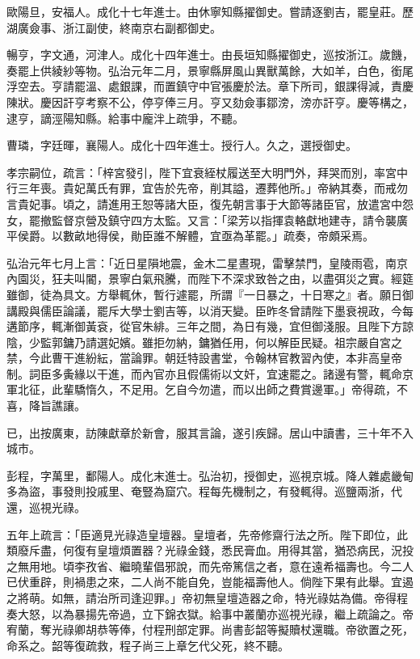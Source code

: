 \begin{pinyinscope}
歐陽旦，安福人。成化十七年進士。由休寧知縣擢御史。嘗請逐劉吉，罷皇莊。歷湖廣僉事、浙江副使，終南京右副都御史。

暢亨，字文通，河津人。成化十四年進士。由長垣知縣擢御史，巡按浙江。歲饑，奏罷上供綾紗等物。弘治元年二月，景寧縣屏風山異獸萬餘，大如羊，白色，銜尾浮空去。亨請罷溫、處銀課，而置鎮守中官張慶於法。章下所司，銀課得減，責慶陳狀。慶因訐亨考察不公，停亨俸三月。亨又劾僉事鄒滂，滂亦訐亨。慶等構之，逮亨，謫涇陽知縣。給事中龐泮上疏爭，不聽。

曹璘，字廷暉，襄陽人。成化十四年進士。授行人。久之，選授御史。

孝宗嗣位，疏言：「梓宮發引，陛下宜衰絰杖履送至大明門外，拜哭而別，率宮中行三年喪。貴妃萬氏有罪，宜告於先帝，削其謚，遷葬他所。」帝納其奏，而戒勿言貴妃事。頃之，請進用王恕等諸大臣，復先朝言事于大節等諸臣官，放遣宮中怨女，罷撤監督京營及鎮守四方太監。又言：「梁芳以指揮袁輅獻地建寺，請令襲廣平侯爵。以數畝地得侯，勛臣誰不解體，宜亟為革罷。」疏奏，帝頗采焉。

弘治元年七月上言：「近日星隕地震，金木二星晝現，雷擊禁門，皇陵雨雹，南京內園災，狂夫叫閽，景寧白氣飛騰，而陛下不深求致咎之由，以盡弭災之實。經筵雖御，徒為具文。方舉輒休，暫行遽罷，所謂『一日暴之，十日寒之』者。願日御講殿與儒臣論議，罷斥大學士劉吉等，以消天變。臣昨冬曾請陛下墨衰視政，今每遘節序，輒漸御黃袞，從官朱緋。三年之間，為日有幾，宜但御淺服。且陛下方諒陰，少監郭鏞乃請選妃嬪。雖拒勿納，鏞猶任用，何以解臣民疑。祖宗嚴自宮之禁，今此曹干進紛紜，當論罪。朝廷特設書堂，令翰林官教習內使，本非高皇帝制。詞臣多夤緣以干進，而內官亦且假儒術以文奸，宜速罷之。諸邊有警，輒命京軍北征，此輩驕惰久，不足用。乞自今勿遣，而以出師之費賞邊軍。」帝得疏，不喜，降旨譙讓。

已，出按廣東，訪陳獻章於新會，服其言論，遂引疾歸。居山中讀書，三十年不入城市。

彭程，字萬里，鄱陽人。成化末進士。弘治初，授御史，巡視京城。降人雜處畿甸多為盜，事發則投戚里、奄豎為窟穴。程每先機制之，有發輒得。巡鹽兩浙，代還，巡視光祿。

五年上疏言：「臣適見光祿造皇壇器。皇壇者，先帝修齋行法之所。陛下即位，此類廢斥盡，何復有皇壇煩置器？光祿金錢，悉民膏血。用得其當，猶恐病民，況投之無用地。頃李孜省、繼曉輩倡邪說，而先帝篤信之者，意在遠希福壽也。今二人已伏重辟，則禍患之來，二人尚不能自免，豈能福壽他人。倘陛下果有此舉。宜遏之將萌。如無，請治所司逢迎罪。」帝初無皇壇造器之命，特光祿姑為備。帝得程奏大怒，以為暴揚先帝過，立下錦衣獄。給事中叢蘭亦巡視光祿，繼上疏論之。帝宥蘭，奪光祿卿胡恭等俸，付程刑部定罪。尚書彭韶等擬贖杖還職。帝欲置之死，命系之。韶等復疏救，程子尚三上章乞代父死，終不聽。


\end{pinyinscope}

